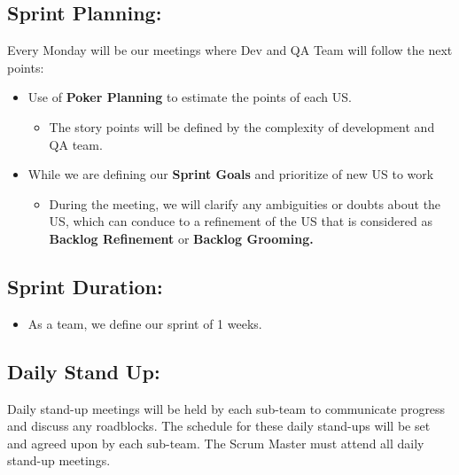 \documentclass{article}
\providecommand{\tightlist}{
  \setlength{\itemsep}{0pt}\setlength{\parskip}{0pt}}
\begin{document}
\hypertarget{sprintplanning}{
\subsection{Sprint Planning:}\label{sprintplanning}}

Every Monday will be our meetings where Dev and QA Team will follow the
next points:

\begin{itemize}
\tightlist
\item
  Use of \textbf{Poker Planning} to estimate the points of each US.

  \begin{itemize}
  \tightlist
  \item
    The story points will be defined by the complexity of development
    and QA team.
  \end{itemize}
\item
  While we are defining our \textbf{Sprint Goals} and prioritize of new
  US to work

  \begin{itemize}
  \tightlist
  \item
    During the meeting, we will clarify any ambiguities or doubts about
    the US, which can conduce to a refinement of the US that is
    considered as \textbf{Backlog Refinement} or \textbf{Backlog
    Grooming.}
  \end{itemize}
\end{itemize}

\hypertarget{sprintduration}{
\subsection{\texorpdfstring{\textbf{Sprint
Duration:}}{Sprint Duration:}}\label{sprintduration}}

\begin{itemize}
\tightlist
\item
  As a team, we define our sprint of 1 weeks.
\end{itemize}

\hypertarget{dailystandup}{
\subsection{Daily Stand Up:}\label{dailystandup}}

Daily stand-up meetings will be held by each sub-team to communicate
progress and discuss any roadblocks. The schedule for these daily
stand-ups will be set and agreed upon by each sub-team. The Scrum Master
must attend all daily stand-up meetings.
\end{document}
